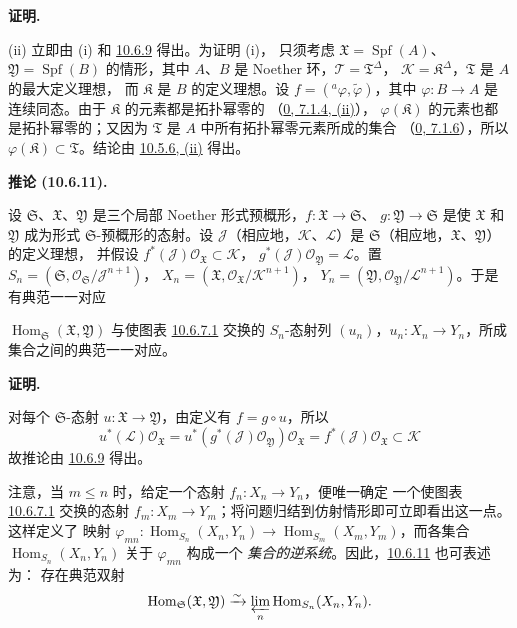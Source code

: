 \documentclass[UTF8,fontset=none,11pt,oneside,openany]{ctexbook}
\newenvironment{corollary}[1][]{%
  \par\medskip\noindent\textbf{推论 (#1).}\ %
}{\par}
\newenvironment{proof}{%
  \par\medskip\noindent\textbf{证明.}\ %
}{\par}
\newcommand{\oldpage}[2][]{%
  \hypertarget{ega-source-page-#1-#2}{}%
  \marginnote{\scriptsize\textbf{#1}~|~#2}\ignorespaces}
\let\EGAOriginalLabel\label
\renewcommand{\label}[1]{\phantomsection\EGAOriginalLabel{#1}}
\begin{document}
\begin{proof}
(ii) 立即由 (i) 和 \hyperref[I.10.6.9-fr]{10.6.9} 得出。为证明 (i)，
只须考虑 $\mathfrak{X}=\operatorname{Spf}(A)$、
$\mathfrak{Y}=\operatorname{Spf}(B)$ 的情形，其中 $A$、$B$ 是 Noether
环，$\mathscr{T}=\mathfrak{T}^\Delta$，
$\mathscr{K}=\mathfrak{K}^\Delta$，$\mathfrak{T}$ 是 $A$ 的最大定义理想，
而 $\mathfrak{K}$ 是 $B$ 的定义理想。设
$f=({}^a\varphi,\widetilde{\varphi})$，其中
$\varphi:B\to A$ 是连续同态。由于 $\mathfrak{K}$ 的元素都是拓扑幂零的
（\hyperref[0.7.1.4-fr]{0, 7.1.4, (ii)}），
$\varphi(\mathfrak{K})$ 的元素也都是拓扑幂零的；又因为
$\mathfrak{T}$ 是 $A$ 中所有拓扑幂零元素所成的集合
（\hyperref[0.7.1.6-fr]{0, 7.1.6}），所以
$\varphi(\mathfrak{K})\subset\mathfrak{T}$。结论由
\hyperref[I.10.5.6-fr]{10.5.6, (ii)} 得出。
\end{proof}

\begin{corollary}[10.6.11]
\label{I.10.6.11-fr}
设 $\mathfrak{S}$、$\mathfrak{X}$、$\mathfrak{Y}$ 是三个局部 Noether
形式预概形，$f:\mathfrak{X}\to\mathfrak{S}$、
$g:\mathfrak{Y}\to\mathfrak{S}$ 是使 $\mathfrak{X}$ 和
$\mathfrak{Y}$ 成为形式 $\mathfrak{S}$-预概形的态射。设
$\mathscr{J}$（相应地，$\mathscr{K}$、$\mathscr{L}$）是
$\mathfrak{S}$（相应地，$\mathfrak{X}$、$\mathfrak{Y}$）的定义理想，
并假设
$f^*(\mathscr{J})\mathscr{O}_{\mathfrak{X}}\subset\mathscr{K}$，
$g^*(\mathscr{J})\mathscr{O}_{\mathfrak{Y}}=\mathscr{L}$。置
$S_n=(\mathfrak{S},
\mathscr{O}_{\mathfrak{S}}/\mathscr{J}^{n+1})$，
$X_n=(\mathfrak{X},
\mathscr{O}_{\mathfrak{X}}/\mathscr{K}^{n+1})$，
$Y_n=(\mathfrak{Y},
\mathscr{O}_{\mathfrak{Y}}/\mathscr{L}^{n+1})$。于是有典范一一对应

\oldpage[I]{193}

$\operatorname{Hom}_{\mathfrak{S}}(\mathfrak{X},\mathfrak{Y})$ 与使图表
\hyperref[I.10.6.7.1-fr]{10.6.7.1} 交换的 $S_n$-态射列
$(u_n)$，$u_n:X_n\to Y_n$，所成集合之间的典范一一对应。
\end{corollary}

\begin{proof}
对每个 $\mathfrak{S}$-态射 $u:\mathfrak{X}\to\mathfrak{Y}$，由定义有
$f=g\circ u$，所以
\[
  u^*(\mathscr{L})\mathscr{O}_{\mathfrak{X}}
  =u^*(g^*(\mathscr{J})\mathscr{O}_{\mathfrak{Y}})
    \mathscr{O}_{\mathfrak{X}}
  =f^*(\mathscr{J})\mathscr{O}_{\mathfrak{X}}
  \subset\mathscr{K}
\]
故推论由 \hyperref[I.10.6.9-fr]{10.6.9} 得出。
\end{proof}

注意，当 $m\leq n$ 时，给定一个态射 $f_n:X_n\to Y_n$，便唯一确定
一个使图表 \hyperref[I.10.6.7.1-fr]{10.6.7.1} 交换的态射
$f_m:X_m\to Y_m$；将问题归结到仿射情形即可立即看出这一点。这样定义了
映射 $\varphi_{mn}:\operatorname{Hom}_{S_n}(X_n,Y_n)
\to\operatorname{Hom}_{S_m}(X_m,Y_m)$，而各集合
$\operatorname{Hom}_{S_n}(X_n,Y_n)$ 关于 $\varphi_{mn}$ 构成一个
\emph{集合的逆系统}。因此，\hyperref[I.10.6.11-fr]{10.6.11} 也可表述为：
存在典范双射
\[
  \operatorname{Hom}_{\mathfrak{S}}(\mathfrak{X},\mathfrak{Y})
  \xrightarrow{\sim}
  \varprojlim_n\operatorname{Hom}_{S_n}(X_n,Y_n).
\]
\end{document}
